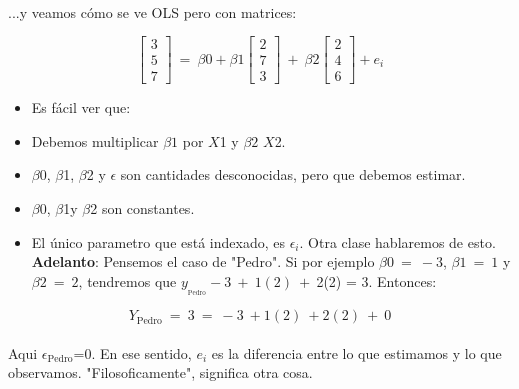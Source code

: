 \documentclass[10pt]{article}
\begin{document}
\paragraph{}...y veamos c\'omo se ve OLS pero con matrices:


\begin{equation*}
\begin{bmatrix}
3\\
5\\
7
\end{bmatrix} \ =\ \beta 0+\beta 1\begin{bmatrix}
2\\
7\\
3
\end{bmatrix} \ +\ \beta 2\begin{bmatrix}
2\\
4\\
6
\end{bmatrix} +e_{i}
\end{equation*}


\begin{itemize}
\item Es f\'acil ver que:
\item Debemos multiplicar $\displaystyle \beta 1$ por $\displaystyle X$1 y $\displaystyle \beta 2$ $\displaystyle X$2.
\item $\displaystyle \beta $0, $\displaystyle \beta $1, $\displaystyle \beta $2 y $\displaystyle \epsilon $ son cantidades desconocidas, pero que debemos estimar.
\item $\displaystyle \beta $0, $\displaystyle \beta $1y $\displaystyle \beta $2 son constantes.
\item El único parametro que est\'a indexado, es $\displaystyle \epsilon _{i}$. Otra clase hablaremos de esto. \textbf{Adelanto}: Pensemos el caso de "Pedro". Si por ejemplo $\displaystyle \beta 0\ =\ -3$, $\displaystyle \beta 1\ =\ 1$ y $\displaystyle \beta 2\ =\ 2$, tendremos que $\displaystyle y_{_{\text{Pedro}}} -3\ +\ 1( 2) \ +\ $2(2) = 3. Entonces:
\end{itemize}


\begin{equation*}
Y_{\text{Pedro}} \ =\ 3\ =\ -3\ +1( 2) \ +2( 2) \ +\ 0
\end{equation*}


\paragraph{}Aqui $\displaystyle \epsilon _{\text{Pedro}}$=0. En ese sentido, $\displaystyle e_{i}$ es la diferencia entre lo que estimamos y lo que observamos. "Filosoficamente", significa otra cosa.
\end{document}
